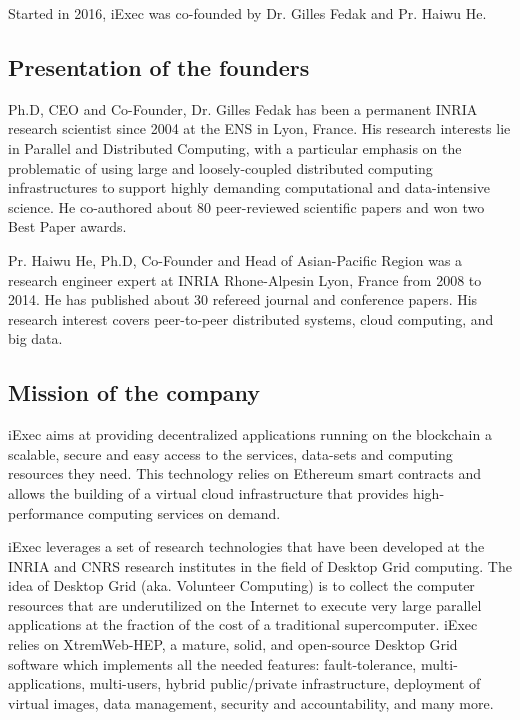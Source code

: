   Started in 2016, iExec\cite{iExec} was co-founded by Dr. Gilles Fedak and Pr. Haiwu He.

  \subsection{Presentation of the founders}
    Ph.D, CEO and Co-Founder, Dr. Gilles Fedak has been a permanent INRIA research scientist since
    2004 at the ENS in Lyon, France. His research interests lie in Parallel and Distributed
    Computing, with a particular emphasis on the problematic of using large and loosely-coupled
    distributed computing infrastructures to support highly demanding computational and
    data-intensive science. He co-authored about 80 peer-reviewed scientific papers and won two
    Best Paper awards.
  
    Pr. Haiwu He, Ph.D, Co-Founder and Head of Asian-Pacific Region was a
    research engineer expert at INRIA Rhone-Alpesin Lyon, France from 2008 to 2014. He has
    published about 30 refereed journal and conference papers. His research interest covers
    peer-to-peer distributed systems, cloud computing, and big data.
  
  \subsection{Mission of the company}
    iExec aims at providing decentralized applications running on the blockchain a scalable,
    secure and easy access to the services, data-sets and computing resources they need. This
    technology relies on Ethereum smart contracts and allows the building of a virtual cloud
    infrastructure that provides high-performance computing services on demand.

    iExec leverages a set of research technologies that have been developed at the INRIA and CNRS
    research institutes in the field of Desktop Grid computing. The idea of Desktop Grid
    (aka. Volunteer Computing) is to collect the computer resources that are underutilized on the
    Internet to execute very large parallel applications at the fraction of the cost of a
    traditional supercomputer. iExec relies on XtremWeb-HEP\cite{xtremweb}, a mature, solid, and open-source Desktop
    Grid software which implements all the needed features: fault-tolerance, multi-applications,
    multi-users, hybrid public/private infrastructure, deployment of virtual images, data management,
    security and accountability, and many more.

